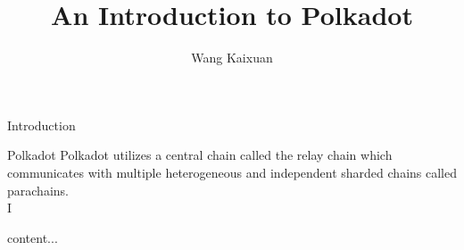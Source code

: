 \documentclass[UTF8]{beamer}
\title{An Introduction to Polkadot}
\author{Wang Kaixuan}
\institute[SJTU]{Shanghai Jiao Tong University}
\begin{document}
	\begin{frame}
		\titlepage
	\end{frame}

	\begin{frame}{Introduction}
		\begin{block}{Polkadot}
			Polkadot utilizes a central chain called the relay chain which communicates with multiple heterogeneous and independent sharded chains called parachains.\\
			I
		\end{block}
		\begin{block}{}
			content...
		\end{block}
	\end{frame}
\end{document}
